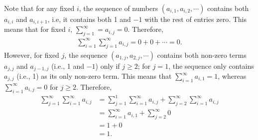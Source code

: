 \documentclass[12pt]{article}
\begin{document}
\begin{fproof}[3(a)]
 Note that for any fixed \(i\), the sequence of numbers \((a_{i,1}, a_{i,2}, \cdots)\) contains both \(a_{i,i}\) and \(a_{i,i+1}\), i.e, it contains both 1 and \(-1\) with the rest of entries zero.
 This means that for fixed \(i\), \(\sum_{j=1}^{\infty} = a_{i,j} = 0\).
 Therefore,
 \begin{align*}
    \sum_{i=1}^{\infty} \sum_{j=1}^{\infty} a_{i,j} = 0 + 0 + \cdots = 0.
 \end{align*}
 However, for fixed \(j\), the sequence \((a_{1,j}, a_{2,j}, \cdots)\) contains both non-zero terms \(a_{j,j}\) and \(a_{j-1,j}\) (i.e., 1 and \(-1\)) only if \(j \geq 2\); for \(j =1\), the sequence only contains \(a_{j,j}\) (i.e., 1) as its only non-zero term.
 This means that \(\sum_{i=1}^{\infty}a_{i,1} = 1\), whereas \(\sum_{i=1}^{\infty} a_{i,j} = 0\) for \(j \geq 2\).
 Therefore,
 \begin{align*}
    \sum_{j=1}^{\infty} \sum_{i=1}^{\infty} a_{i,j} 
    &= \sum_{j=1}^{1} \sum_{i=1}^{\infty} a_{i,j} + \sum_{j=2}^{\infty} \sum_{i=1}^{\infty} a_{i,j}\\
    &=\sum_{i=1}^{\infty} a_{i,1} + \sum_{j=2}^{\infty} 0\\
    &= 1 + 0\\
    & = 1.
 \end{align*}
\end{fproof}
\end{document}
